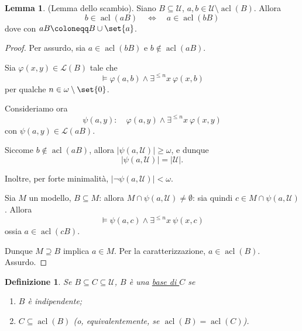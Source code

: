 \documentclass[10pt]{article}
\newcommand{\card}[1]{\left\vert #1 \right\vert}
\newcommand{\1}{\mathds{1}}
\theoremstyle{definition}%
\newtheorem{lem}[thm]{Lemma}
\theoremstyle{plain}
\newtheorem{definizione}[thm]{Definizione}
\theoremstyle{remark}
\begin{document}
\begin{lem}
(Lemma dello scambio). Siano \(B \subseteq \mathcal{U}\), \(a,b \in \mathcal{U}\setminus\operatorname{acl}(B)\). Allora
\begin{equation*}
b \in \operatorname{acl}(aB)\quad\iff\quad a \in \operatorname{acl}(bB)
\end{equation*}
dove con \(aB\coloneqq B\cup\set{a}\).
\end{lem}
\begin{proof}
Per assurdo, sia \(a \in \operatorname{acl}(bB)\) e \(b \notin \operatorname{acl}(aB)\).

Sia \(\varphi(x,y) \in \mathcal{L}(B)\) tale che
\begin{equation*}
\vDash\varphi(a,b) \land \exists^{\le n} x\ \varphi(x,b)
\end{equation*}
per qualche \(n \in \omega\setminus\set{0}\).

Consideriamo ora
\begin{equation*}
\psi(a,y):\quad \varphi(a,y) \land \exists^{\le n} x\ \varphi(x,y)
\end{equation*}
con \(\psi(a,y) \in \mathcal{L}(aB)\).

Siccome \(b\notin \operatorname{acl}(aB)\), allora \(\card{\psi(a,\mathcal{U})}\ge \omega\), e dunque
\begin{equation*}
\card{\psi(a,\mathcal{U})}=\card{\mathcal{U}}.
\end{equation*}

Inoltre, per forte minimalità, \(\card{\lnot\psi(a,\mathcal{U})}<\omega\).

Sia \(M\) un modello, \(B \subseteq M\): allora \(M\cap \psi(a,\mathcal{U})\neq \emptyset\): sia quindi \(c \in M\cap \psi(a,\mathcal{U})\). Allora
\begin{equation*}
\vDash \psi(a,c) \land \exists^{\le n} x\ \psi(x,c)
\end{equation*}
ossia \(a \in \operatorname{acl}(cB)\).

Dunque \(M \supseteq B\) implica \(a \in M\). Per la caratterizzazione, \(a \in \operatorname{acl}(B)\). Assurdo.
\end{proof}
\begin{definizione}
Se \(B \subseteq C \subseteq \mathcal{U}\), \(B\) è una \uline{base di \(C\)} se
\begin{enumerate}
\item \(B\) è indipendente;
\item \(C \subseteq \operatorname{acl}(B)\) (o, equivalentemente, se \(\operatorname{acl}(B)=\operatorname{acl}(C)\)).
\end{enumerate}
\end{definizione}
\end{document}
